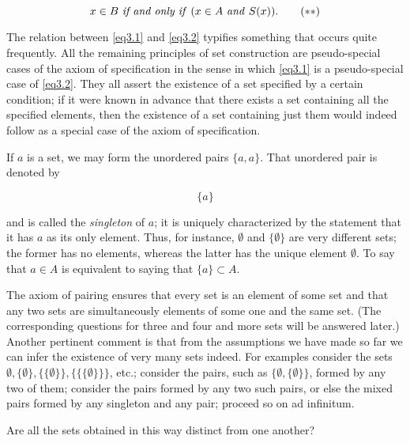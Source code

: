 \begin{equation}
\label{eq3.2}
x \in B \text{ \textit{if and only if} } (x \in A \text{ \textit{and} }  S(x)). \tag{$\ast \ast$}
\end{equation}

The relation between \eqref{eq3.1} and \eqref{eq3.2} typifies something that occurs quite frequently. All the remaining principles of set construction are pseudo-special cases of the axiom of specification in the sense in which \eqref{eq3.1} is a pseudo-special case of \eqref{eq3.2}. They all assert the existence of a set specified by a certain condition; if it were known in advance that there exists a set containing all the specified elements, then the existence of a set containing just them would indeed follow as a special case of the axiom of specification. 

If $a$ is a set, we may form the unordered pairs $\{a, a\}$. That unordered pair is denoted by 

\begin{equation*}
\{ a \}
\end{equation*}

and is called the \textit{singleton} of $a$; it is uniquely characterized by the statement that it has $a$ as its only element. Thus, for instance, $ \emptyset $ and $ \{ \emptyset \}$ are very different sets; the former has no elements, whereas the latter has the unique element $ \emptyset $. To say that $a \in A$ is equivalent to saying that $\{a\} \subset A$. 

The axiom of pairing ensures that every set is an element of some set and that any two sets are simultaneously elements of some one and the same set. (The corresponding questions for three and four and more sets will be answered later.) Another pertinent comment is that from the assumptions we have made so far we can infer the existence of very many sets indeed. For examples  consider the sets $ \emptyset, \{ \emptyset \}, \{ \{ \emptyset \} \}, \{ \{ \{ \emptyset \} \} \} $, etc.; consider the pairs, such as  $ \{ \emptyset, \{ \emptyset \} \}$, formed by any two of them; consider the pairs formed by any two such pairs, or else the mixed pairs formed by any singleton and any pair; proceed so on ad infinitum.

\begin{exercise} Are all the sets obtained in this way distinct from one another? 
\end{exercise}

